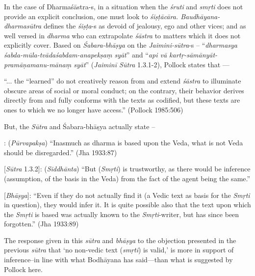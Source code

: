 In the case of Dharmaśāstra-s, in a situation when the {\sl śruti} and {\sl smṛti} does not provide an explicit conclusion, one must look to {\sl śiṣṭācāra. Baudhāyana-dharmasūtra} deﬁnes the {\sl śiṣṭa}-s as devoid of jealousy, ego and other vices; and as well versed in {\sl dharma} who can extrapolate {\sl śāstra} to matters which it does not explicitly cover. Based on {\sl Śabara-bhāṣya} on the {\sl Jaimini-sūtra}-s -- ``{\sl dharmasya śabda-mūla-tvādaśabdam-anapekṣaṃ syāt}''  and ``{\sl api vā kartṛ-sāmānyāt-pramāṇamanu-mānaṃ syāt}'' ({\sl Jaiminī Sūtra} 1.3.1-2), Pollock states that ---
\begin{myquote}
``... the ``learned'' do not creatively reason from and extend {\sl śāstra} to illuminate obscure areas of social or moral conduct; on the contrary, their behavior derives directly from and fully conforms with the texts as codiﬁed, but these texts are ones to which we no longer have access.'' (Pollock 1985:506)
\end{myquote}

But, the {\sl Sūtra} and Śabara-bhāṣya actually state --
\begin{myquote}
[{\sl Sūtra} 1.3.1]: ({\sl Pūrvapakṣa}) ``Inasmuch as dharma is based upon the Veda, what is not Veda should be disregarded.'' (Jha 1933:87) 

[{\sl Sūtra} 1.3.2]: ({\sl Siddhānta}) ``But ({\sl Smṛti}) is trustworthy, as there would be inference (assumption, of the basis in the Veda) from the fact of the agent being the same.'' 

[{\sl Bhāṣya}]: ``Even if they do not actually find it (a Vedic text as basis for the {\sl Smṛti} in question), they would infer it. It is quite possible also that the text upon which the {\sl Smṛti} is based was actually known to the {\sl Smṛti}-writer, but has since been forgotten.'' (Jha 1933:89)
\end{myquote}

The response given in this {\sl sūtra} and {\sl bhāṣya} to the objection presented in the previous {\sl sūtra} that `no non-vedic text ({\sl smṛti}) is valid,' is more in support of inference--in line with what Bodhāyana has said---than what is suggested by Pollock here. 

